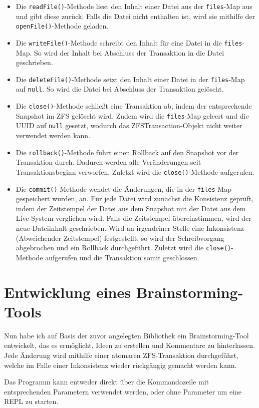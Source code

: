 \documentclass[12pt]{article}
\begin{document}
\begin{itemize}
	\item Die \texttt{readFile()}-Methode liest den Inhalt einer Datei aus der \texttt{files}-Map aus und gibt diese zurück.
	Falls die Datei nicht enthalten ist, wird sie mithilfe der \texttt{openFile()}-Methode geladen.
	
	\item Die \texttt{writeFile()}-Methode schreibt den Inhalt für eine Datei in die \texttt{files}-Map.
	So wird der Inhalt bei Abschluss der Transaktion in die Datei geschrieben.
	
	\item Die \texttt{deleteFile()}-Methode setzt den Inhalt einer Datei in der \texttt{files}-Map auf \texttt{null}.
	So wird die Datei bei Abschluss der Transaktion gelöscht.
	
	\item Die \texttt{close()}-Methode schließt eine Transaktion ab, indem der entsprechende Snapshot im ZFS gelöscht wird.
	Zudem wird die \texttt{files}-Map geleert und die UUID auf \texttt{null} gesetzt, wodurch das ZFSTransaction-Objekt nicht weiter verwendet werden kann.
	
	\item Die \texttt{rollback()}-Methode führt einen Rollback auf den Snapshot vor der Transaktion durch. 
	Dadurch werden alle Veränderungen seit Transaktionsbeginn verworfen.
	Zuletzt wird die \texttt{close()}-Methode aufgerufen.
	
	\item Die \texttt{commit()}-Methode wendet die Änderungen, die in der \texttt{files}-Map gespeichert wurden, an.
	Für jede Datei wird zunächst die Konsistenz geprüft, indem der Zeitstempel der Datei aus dem Snapshot mit der Datei aus dem Live-System verglichen wird.
	Falls die Zeitstempel übereinstimmen, wird der neue Dateiinhalt geschrieben.
	Wird an irgendeiner Stelle eine Inkonsistenz (Abweichender Zeitstempel) festgestellt, so wird der Schreibvorgang abgebrochen und ein Rollback durchgeführt.
	Zuletzt wird die \texttt{close()}-Methode aufgerufen und die Transaktion somit geschlossen.
\end{itemize}

\section*{Entwicklung eines Brainstorming-Tools}
Nun habe ich auf Basis der zuvor angelegten Bibliothek ein Brainstorming-Tool entwickelt, das es ermöglicht, Ideen zu erstellen und Kommentare zu hinterlassen.
Jede Änderung wird mithilfe einer atomaren ZFS-Transaktion durchgeführt, welche im Falle einer Inkonsistenz wieder rückgängig gemacht werden kann.

Das Programm kann entweder direkt über die Kommandozeile mit entsprechenden Parametern verwendet werden, oder ohne Parameter um eine REPL zu starten.
\end{document}
